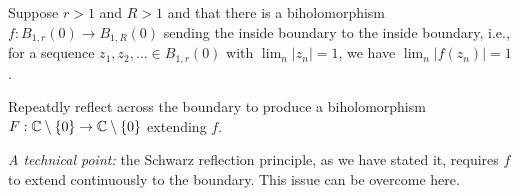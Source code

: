 \documentclass{homework}
\begin{document}
                                                                                                                                                        \begin{problem}\label{annulus-to-punctured-disk}Suppose $r > 1$ and $R > 1$ and that there is a biholomorphism
                                                                                                                                                          $f : B_{1,r}(0) \to B_{1,R}(0)$ sending the inside boundary to the
                                                                                                                                                            inside boundary, i.e., for a sequence
                                                                                                                                                              $z_1, z_2, \ldots \in B_{1,r}(0)$ with $\lim_n |z_n| = 1$, we have
                                                                                                                                                                $\lim_n |f(z_n)| = 1$.
                                                                                                                                                                  
                                                                                                                                                                    Repeatdly reflect across the boundary to produce a biholomorphism
                                                                                                                                                                      $F : \mathbb{C} \setminus \{0\} \to \mathbb{C} \setminus \{0\}$ extending $f$.

                                                                                                                                                                        \textit{A technical point:} the Schwarz reflection principle, as we
                                                                                                                                                                          have stated it, requires $f$ to extend continuously to the boundary.
                                                                                                                                                                            This issue can be overcome here.
                                                                                                                                                                            \end{problem}
\end{document}
